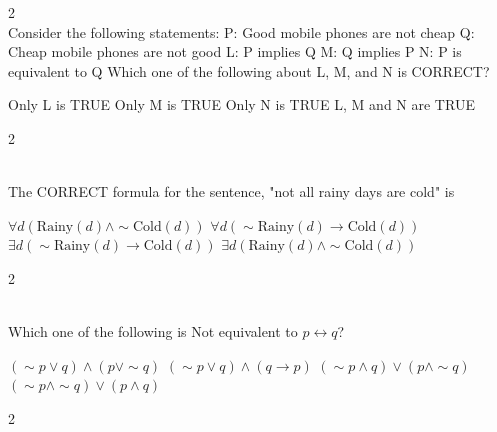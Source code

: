 \documentclass[12pt]{exam}
\begin{document}
\begin{questions}
\begin{multicols*}{2}
 \\[0.2cm]
{\Large Consider the following statements:\newline
P: Good mobile phones are not cheap\newline
Q: Cheap mobile phones are not good\newline
L: P implies Q\newline
M: Q implies P\newline
N: P is equivalent to Q\newline
Which one of the following about L, M, and N is CORRECT?}
\begin{choices}
  \choice Only L is TRUE
  \choice Only M is TRUE
  \choice Only N is TRUE
  \choice L, M and N are TRUE
\end{choices}

\end{multicols*}
\vspace{0.6cm}
\newpage
\begin{multicols*}{2}

 \\[0.2cm]
{\Large The CORRECT formula for the sentence, "not all rainy days are cold" is}
\begin{choices}
  \choice $\forall d (\text{Rainy}(d) \wedge \sim \text{Cold}(d))$
  \choice $\forall d (\sim \text{Rainy}(d) \rightarrow \text{Cold}(d))$
  \choice $\exists d (\sim \text{Rainy}(d) \rightarrow \text{Cold}(d))$
  \choice $\exists d (\text{Rainy}(d) \wedge \sim \text{Cold}(d))$
\end{choices}

\end{multicols*}
\vspace{0.6cm}
\newpage
\begin{multicols*}{2}

 \\[0.2cm]
{\Large Which one of the following is Not equivalent to $p \leftrightarrow q$?}
\begin{choices}
  \choice $(\sim p \vee q) \wedge (p \vee \sim q)$
  \choice $(\sim p \vee q) \wedge (q \rightarrow p)$
  \choice $(\sim p \wedge q) \vee (p \wedge \sim q)$
  \choice $(\sim p \wedge \sim q) \vee (p \wedge q)$
\end{choices}

\end{multicols*}
\vspace{0.6cm}
\newpage
\begin{multicols*}{2}


\end{multicols*}
\end{questions}
\end{document}
